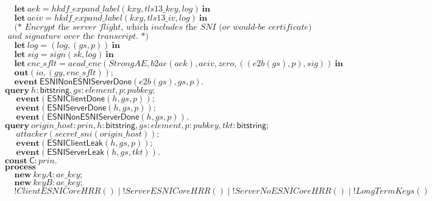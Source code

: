 \documentclass{article}
\theoremstyle{definition}
\newcommand{\kwl}[1]{\mathbf{#1}}
\newcommand{\kwc}[1]{\mathsf{#1}}
\newcommand{\kwt}[1]{\mathsf{#1}}
\newcommand{\kwe}[1]{\mathsf{#1}}
\newcommand{\var}[1]{\mathit{#1}}
\theoremstyle{definition}
\begin{document}
\begin{tabbing}
$\ \ \ \ \ \kwl{let}\ \var{aek} = \var{hkdf{\_}expand{\_}label}(\var{kxy}, \var{tls13{\_}key}, \var{log})\ \kwl{in} $\\
$\ \ \ \ \ \kwl{let}\ \var{aeiv} = \var{hkdf{\_}expand{\_}label}(\var{kxy}, \var{tls13{\_}iv}, \var{log})\ \kwl{in} $\\
$ $\\
$\ \ \ \ \ \textit{(* Encrypt the server flight, which includes the SNI (or would-be certificate) }$\\
$\textit{        and signature over the transcript. *)} $\\
$\ \ \ \ \ \kwl{let}\ \var{log} = (\var{log}, (\var{gs}, \var{p}))\ \kwl{in} $\\
$\ \ \ \ \ \kwl{let}\ \var{sig} = \var{sign}(\var{sk}, \var{log})\ \kwl{in} $\\
$\ \ \ \ \ \kwl{let}\ \var{enc{\_}sflt} = \var{aead{\_}enc}(\var{StrongAE}, \var{b2ae}(\var{aek}), \var{aeiv}, \var{zero}, ((\var{e2b}(\var{gs}), \var{p}), \var{sig}))\ \kwl{in} $\\
$\ \ \ \ \ \kwl{out}(\var{io}, (\var{gy}, \var{enc{\_}sflt})); $\\
$\ \ \ \ \ \kwl{event}\ \kwe{ESNINonESNIServerDone}(\var{e2b}(\var{gs}), \var{gs}, \var{p}). $\\
$ $\\
$\kwl{query}\ \var{h}{:}\kwt{bitstring}, \var{gs}{:}\var{element}, \var{p}{:}\var{pubkey}; $\\
$\ \ \ \ \ \ \kwl{event}(\kwe{ESNIClientDone}(\var{h}, \var{gs}, \var{p})); $\\
$\ \ \ \ \ \ \kwl{event}(\kwe{ESNIServerDone}(\var{h}, \var{gs}, \var{p})); $\\
$\ \ \ \ \ \ \kwl{event}(\kwe{ESNINonESNIServerDone}(\var{h}, \var{gs}, \var{p})). $\\
$ $\\
$\kwl{query}\ \var{origin{\_}host}{:}\var{prin}, \var{h}{:}\kwt{bitstring}, \var{gs}{:}\var{element}, \var{p}{:}\var{pubkey}, \var{tkt}{:}\kwt{bitstring}; $\\
$\ \ \ \ \ \ \var{attacker}(\var{secret{\_}sni}(\var{origin{\_}host})); $\\
$\ \ \ \ \ \ \kwl{event}(\kwe{ESNIClientLeak}(\var{h}, \var{gs}, \var{p})); $\\
$\ \ \ \ \ \ \kwl{event}(\kwe{ESNIServerLeak}(\var{h}, \var{gs}, \var{tkt})). $\\
$ $\\
$\kwl{const}\ \kwc{C}{:}\var{prin}. $\\
$\kwl{process} $\\
$\ \ \ \ \ \kwl{new}\ \var{keyA}{:}\var{ae{\_}key}; $\\
$\ \ \ \ \ \kwl{new}\ \var{keyB}{:}\var{ae{\_}key}; $\\
$\ \ \ \ \ !\var{ClientESNICoreHRR}()\mid!\var{ServerESNICoreHRR}()\mid!\var{ServerNoESNICoreHRR}()\mid!\var{LongTermKeys}() $\\
$$
\end{tabbing}
\end{document}

